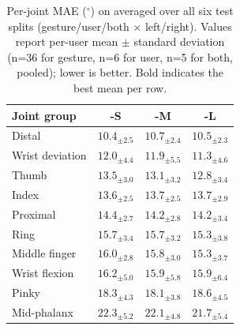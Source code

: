 \begin{table}[h]
\centering
\caption{Per-joint MAE ($^\circ$) on \dataset{} averaged over all six test splits (gesture/user/both $\times$ left/right). Values report per-user mean $\pm$ standard deviation (n=36 for gesture, n=6 for user, n=5 for both, pooled); lower is better. Bold indicates the best mean per row.}
\label{tab:per_joint_egoemg}
\footnotesize
\setlength{\tabcolsep}{3.5pt}
\renewcommand{\arraystretch}{1.05}
\begin{tabular}{lccc}
\toprule
Joint group & \model{}-S & \model{}-M & \model{}-L \\
\midrule
Distal & $\mathbf{10.4_{\pm2.5}}$ & $10.7_{\pm2.4}$ & $10.5_{\pm2.3}$ \\
Wrist deviation & $12.0_{\pm4.4}$ & $11.9_{\pm5.5}$ & $\mathbf{11.3_{\pm4.6}}$ \\
Thumb & $13.5_{\pm3.0}$ & $13.1_{\pm3.2}$ & $\mathbf{12.8_{\pm3.4}}$ \\
Index & $\mathbf{13.6_{\pm2.5}}$ & $13.7_{\pm2.5}$ & $13.7_{\pm2.9}$ \\
Proximal & $14.4_{\pm2.7}$ & $\mathbf{14.2_{\pm2.8}}$ & $\mathbf{14.2_{\pm3.4}}$ \\
Ring & $15.7_{\pm3.4}$ & $15.7_{\pm3.2}$ & $\mathbf{15.3_{\pm3.8}}$ \\
Middle finger & $16.0_{\pm2.8}$ & $15.8_{\pm3.0}$ & $\mathbf{15.3_{\pm3.7}}$ \\
Wrist flexion & $16.2_{\pm5.0}$ & $\mathbf{15.9_{\pm5.8}}$ & $\mathbf{15.9_{\pm6.4}}$ \\
Pinky & $18.3_{\pm4.3}$ & $\mathbf{18.1_{\pm3.8}}$ & $18.6_{\pm4.5}$ \\
Mid-phalanx & $22.3_{\pm5.2}$ & $22.1_{\pm4.8}$ & $\mathbf{21.7_{\pm5.4}}$ \\
\bottomrule
\end{tabular}
\end{table}

